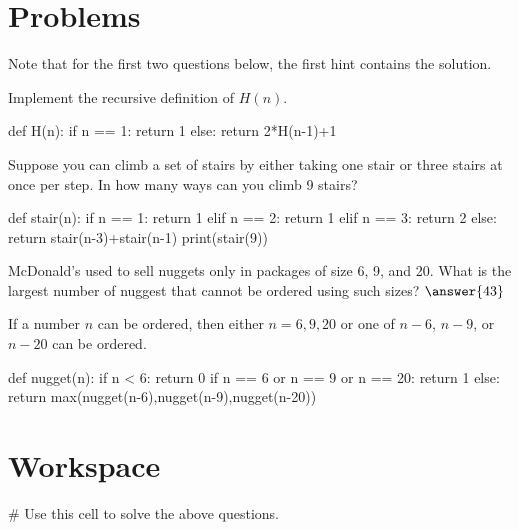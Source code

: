 \documentclass{ximera}
\begin{document}
\section{Problems}

Note that for the first two questions below, the first hint contains the solution.

\begin{question}
Implement the recursive definition of $H(n)$.
	\begin{hint}
\begin{sageCell}
def H(n):
        if n == 1:
                return 1
        else:
		return 2*H(n-1)+1
\end{sageCell}
	\end{hint}
\end{question}

\begin{question}
Suppose you can climb a set of stairs by either taking one stair or three stairs at once per step. In how many ways can you climb 9 stairs?
	\begin{hint}
\begin{sageCell}
def stair(n):
        if n == 1:
                return 1
        elif n == 2:
                return 1
        elif n == 3:
                return 2
        else:
                return stair(n-3)+stair(n-1)
print(stair(9))
\end{sageCell}
\end{hint}
\end{question}

\begin{question}
McDonald's used to sell nuggets only in packages of size 6, 9, and 20. What is the largest number of nuggest that cannot be ordered using such sizes? $\answer{43}$
	\begin{hint}
If a number $n$ can be ordered, then either $n=6,9,20$ or one of $n-6$, $n-9$, or $n-20$ can be ordered.
	\end{hint}
	\begin{hint}
\begin{sageCell}
def nugget(n):
        if n < 6:
                return 0
        if n == 6 or n == 9 or n == 20:
                return 1
        else:
                return max(nugget(n-6),nugget(n-9),nugget(n-20))
\end{sageCell}
	\end{hint}
\end{question}

\section{Workspace}

\begin{sageCell}
# Use this cell to solve the above questions.
\end{sageCell}
\end{document}
